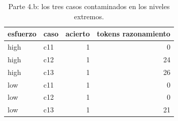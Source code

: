 \begin{table}[H]\centering\caption{Parte 4.b: los tres casos contaminados en los niveles extremos.}\label{tab:p4b}
{\footnotesize\setlength{\tabcolsep}{3.5pt}
\begin{tabular}{llrr}
\hline
esfuerzo & caso & acierto & tokens razonamiento \\
\hline
high & c11 & 1 & 0 \\
high & c12 & 1 & 24 \\
high & c13 & 1 & 26 \\
low & c11 & 1 & 0 \\
low & c12 & 1 & 0 \\
low & c13 & 1 & 21 \\
\hline
\end{tabular}
}\end{table}
